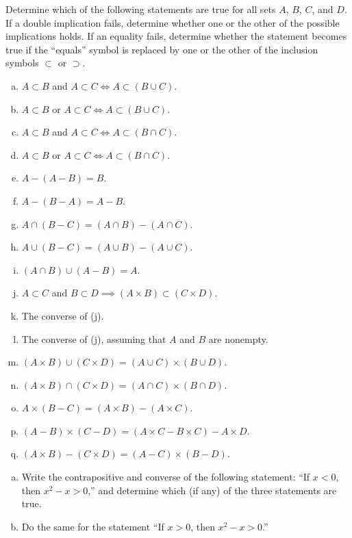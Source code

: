 \documentclass{zupan}
\begin{document}
\begin{problem}{2}
  Determine which of the following statements are true for all sets $A$, $B$,
  $C$, and $D$. If a double implication fails, determine whether one or the
  other of the possible implications holds. If an equality fails, determine
  whether the statement becomes true if the ``equals'' symbol is replaced by
  one or the other of the inclusion symbols $\subset$ or $\supset$.

  \begin{enumerate}[(a), noitemsep]
    \item $A \subset B$ and $A \subset C \iff A \subset (B \cup C)$.
    \item $A \subset B$ or $A \subset C \iff A \subset (B \cup C)$.
    \item $A \subset B$ and $A \subset C \iff A \subset (B \cap C)$.
    \item $A \subset B$ or $A \subset C \iff A \subset (B \cap C)$.
    \item $A - (A - B) = B$.
    \item $A - (B - A) = A - B$.
    \item $A \cap (B - C) = (A \cap B) - (A \cap C)$.
    \item $A \cup (B - C) = (A \cup B) - (A \cup C)$.
    \item $(A \cap B) \cup (A - B) = A$.
    \item $A \subset C$ and $B \subset D \implies (A \times B) \subset (C \times D)$.
    \item The converse of (j).
    \item The converse of (j), assuming that $A$ and $B$ are nonempty.
    \item $(A \times B) \cup (C \times D) = (A \cup C) \times (B \cup D)$.
    \item $(A \times B) \cap (C \times D) = (A \cap C) \times (B \cap D)$.
    \item $A \times (B - C) = (A \times B) - (A \times C)$.
    \item $(A - B) \times (C - D) = (A \times C - B \times C) - A \times D$.
    \item $(A \times B) - (C \times D) = (A - C) \times (B - D)$.
  \end{enumerate}
\end{problem}

\begin{problem}{3}
  \begin{enumerate}[(a), noitemsep]
    \item Write the contrapositive and converse of the following statement:
      ``If $x < 0$, then $x^2 - x > 0$,'' and determine which (if any) of the
      three statements are true.
    \item Do the same for the statement ``If $x > 0$, then $x^2 - x > 0$.''
  \end{enumerate}
\end{problem}
\end{document}
